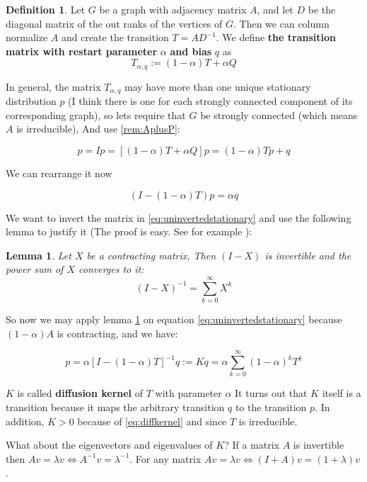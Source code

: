 \documentclass[a4paper,10pt]{article}
\newcommand{\gt}{>}
\theoremstyle{definition}
\newtheorem{mydef}{Definition}[section]
\theoremstyle{remark}
\theoremstyle{plain}
\newtheorem{lemma}{Lemma}[section]
\begin{document}
\begin{mydef}
\label{def:Transitionbiased}
Let $G$ be a graph with adjacency matrix $A$, and let $D$ be the
diagonal matrix of the out ranks of the vertices of $G$. Then we can
column normalize $A$ and create the transition $T = AD^{-1}$.
We define \textbf{the transition matrix with restart parameter}
$\alpha$ \textbf{and bias} $q$ as
\[
T_{\alpha, q} :=
(1 - \alpha)T + \alpha Q
\]
\end{mydef}

In general, 
the matrix $T_{\alpha,q}$ may have more than one unique stationary distribution $p$ 
(I think there is one for each strongly connected
component of its corresponding graph), so lets require that $G$ be
strongly connected (which means $A$ is irreducible),
And use \ref{rem:AplusP}:

\[
p = Ip
= [(1 - \alpha)T + \alpha Q]p =  (1 - \alpha)Tp + q 
\]

We can rearrange it now

\begin{equation}
\label{eq:uninvertedstationary}
(I - (1 - \alpha)T)p = \alpha q
\end{equation}

We want to invert the matrix in \ref{eq:uninvertedstationary} and use the
following lemma to justify it (The proof is easy. See for example
\textcite{serre2010matrices}):

\begin{lemma}
\label{lem:invertible}
Let $X$ be a contracting matrix, Then $(I-X)$ is invertible and the power sum of
$X$ converges to it:
\[
(I - X)^{-1} = \sum_{k=0}^{\infty} X^k
\]
\end{lemma}

So now we may apply lemma \ref{lem:invertible} on equation
\ref{eq:uninvertedstationary} because $(1-\alpha)A$ is contracting, and we have:

\begin{equation}
\label{eq:diffkernel}
p = \alpha [I - (1 - \alpha)T]^{-1} q := K q = 
\alpha \sum_{k=0}^{\infty} (1 - \alpha)^k T^k
\end{equation}

$K$ is called \textbf{diffusion kernel} of $T$ with parameter $\alpha$
It turns out that $K$ itself is a transition because it maps the
arbitrary transition $q$ to the transition $p$. In addition, $K \gt 0$ because
of \ref{eq:diffkernel} and since $T$ is irreducible.

What about the eigenvectors and eigenvalues of $K$?
If a matrix $A$ is invertible then $Av = \lambda v \iff A^{-1}v = \lambda^{-1}$.
For any matrix $Av = \lambda v \iff (I + A)v = (1+\lambda)v$.
\end{document}
